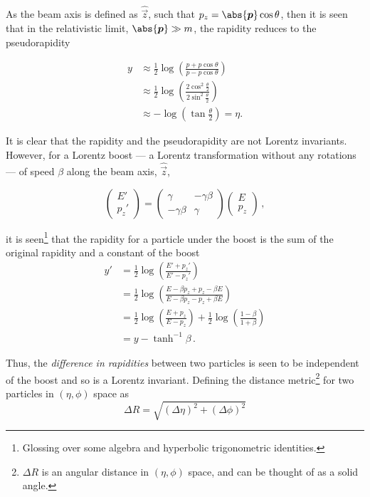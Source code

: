 As the beam axis is defined as $\hat{\vec{z}}$, such that $p_{z} = \abs{\vec{p}} \cos\theta$, then it is seen that in the relativistic limit, $\abs{\vec{p}} \gg m$, the rapidity reduces to the pseudorapidity

\[
 \begin{split}
  y   &\approx \frac{1}{2} \log \left(\frac{p + p\cos\theta}{p - p\cos\theta}\right)\\
  &\approx \frac{1}{2} \log \left(\frac{2 \cos^{2} \frac{\theta}{2}}{2 \sin^{2} \frac{\theta}{2}}\right) \\
  &\approx - \log \left(\tan \frac{\theta}{2}\right) = \eta.
 \end{split}
\]

It is clear that the rapidity and the pseudorapidity are not \Glspl{Lorentz invariant}.
However, for a Lorentz \gls{boost} --- a Lorentz transformation without any rotations --- of speed $\beta$ along the beam axis, $\hat{\vec{z}}$,

\[
 \begin{pmatrix}
  E' \\
  p_{z}'
 \end{pmatrix}
 =
 \begin{pmatrix}%
  \gamma       & -\gamma\beta \\%
  -\gamma\beta & \gamma
 \end{pmatrix}%
 \begin{pmatrix}
  E \\
  p_{z}
 \end{pmatrix}\,,
\]

it is seen\footnote{Glossing over some algebra and hyperbolic trigonometric identities.} that the rapidity for a particle under the boost is the sum of the original rapidity and a constant of the boost
\[
 \begin{split}
  y'  &= \frac{1}{2} \log \left(\frac{E' + p_{z}'}{E' - p_{z}'}\right) \\
  &= \frac{1}{2} \log \left(\frac{E - \beta p_{z} + p_{z} - \beta E}{E - \beta p_{z} - p_{z} + \beta E}\right) \\
  &= \frac{1}{2} \log \left(\frac{E + p_{z}}{E - p_{z}}\right) + \frac{1}{2} \log \left(\frac{1 - \beta}{1 + \beta}\right) \\
  &= y - \tanh^{-1}\beta\,.
 \end{split}
\]

Thus, the \emph{difference in rapidities} between two particles is seen to be independent of the boost and so is a \Gls{Lorentz invariant}.
Defining the distance metric\footnote{$\Delta R$ is an angular distance in $\left(\eta, \phi\right)$ space, and can be thought of as a solid angle.} for two particles in $\left(\eta, \phi\right)$ space as
\begin{equation}
 \Delta R = \sqrt{\left(\Delta\eta\right)^{2} + \left(\Delta\phi\right)^{2}}
 \label{eq:DeltaR}
\end{equation}

